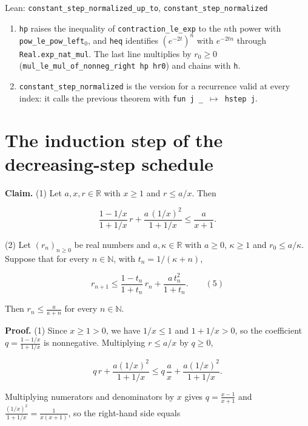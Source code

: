 \documentclass[11pt,a4paper]{article}
\begin{document}
\begin{leanbox}{Lean: \texttt{constant\_\allowbreak{}step\_\allowbreak{}normalized\_\allowbreak{}up\_\allowbreak{}to}, \texttt{constant\_\allowbreak{}step\_\allowbreak{}normalized}}
\begin{enumerate}
\item \texttt{hp} raises the inequality of \texttt{contraction\_\allowbreak{}le\_\allowbreak{}exp} to the \(n\)th power with \texttt{pow\_\allowbreak{}le\_\allowbreak{}pow\_\allowbreak{}left\ensuremath{{}_{0}}}, and \texttt{heq} identifies \((e^{-2t})^n\) with \(e^{-2tn}\) through \texttt{Real.\allowbreak{}exp\_\allowbreak{}nat\_\allowbreak{}mul}. The last line multiplies by \(r_0\ge0\) (\texttt{mul\_\allowbreak{}le\_\allowbreak{}mul\_\allowbreak{}of\_\allowbreak{}nonneg\_\allowbreak{}right hp hr0}) and chains with \texttt{h}.

\item \texttt{constant\_\allowbreak{}step\_\allowbreak{}normalized} is the version for a recurrence valid at every index: it calls the previous theorem with \texttt{fun j \_\allowbreak{} \ensuremath{\mapsto} hstep j}.

\end{enumerate}
\end{leanbox}

\section{\texorpdfstring{The induction step of the decreasing-step schedule}{The induction step of the decreasing-step schedule}}


\textbf{Claim.} (1) Let \(a,x,r\in\mathbb R\) with \(x\ge1\) and \(r\le a/x\). Then


\[\frac{1-1/x}{1+1/x}\,r+\frac{a\,(1/x)^2}{1+1/x}\le\frac a{x+1}.\]


(2) Let \((r_n)_{n\ge0}\) be real numbers and \(a,\kappa\in\mathbb R\) with \(a\ge0\), \(\kappa\ge1\) and \(r_0\le a/\kappa\). Suppose that for every \(n\in\mathbb N\), with \(t_n=1/(\kappa+n)\),


\[r_{n+1}\le\frac{1-t_n}{1+t_n}\,r_n+\frac{a\,t_n^2}{1+t_n}.\qquad(5)\]


Then \(r_n\le\frac a{\kappa+n}\) for every \(n\in\mathbb N\).




\textbf{Proof.} (1) Since \(x\ge1>0\), we have \(1/x\le1\) and \(1+1/x>0\), so the coefficient \(q=\frac{1-1/x}{1+1/x}\) is nonnegative. Multiplying \(r\le a/x\) by \(q\ge0\),


\[q\,r+\frac{a(1/x)^2}{1+1/x}\le q\,\frac ax+\frac{a(1/x)^2}{1+1/x}.\]


Multiplying numerators and denominators by \(x\) gives \(q=\frac{x-1}{x+1}\) and \(\frac{(1/x)^2}{1+1/x}=\frac1{x(x+1)}\), so the right-hand side equals
\end{document}
